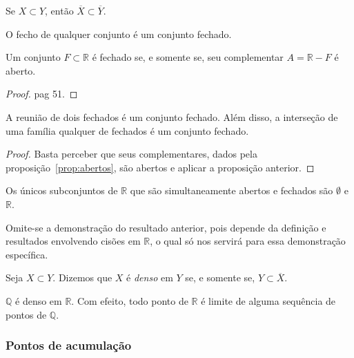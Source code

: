 \begin{proposicao}
	Se $X\subset Y$, então $\overline X \subset \overline Y$.
\end{proposicao}

\begin{proposicao}
	O fecho de qualquer conjunto é um conjunto fechado.
\end{proposicao}

\begin{proposicao}
	Um conjunto $F\subset \mathbb{R}$ é fechado se, e somente se, seu complementar $A= \mathbb{R}-F$ é aberto.
	\begin{proof}
		\cite{elonAnalise1} pag 51.
	\end{proof}
\end{proposicao}

\begin{corolario}
	A reunião de dois fechados é um conjunto fechado. Além disso, a interseção de uma família qualquer de fechados é um conjunto fechado. 
	\begin{proof}
		Basta perceber que seus complementares, dados pela proposição~\ref{prop:abertos}, são abertos e aplicar a proposição anterior.
	\end{proof}
\end{corolario}

\begin{proposicao}
	Os únicos subconjuntos de $\mathbb{R}$ que são simultaneamente abertos e fechados são $\emptyset$ e $\mathbb{R}$.
\end{proposicao}
Omite-se a demonstração do resultado anterior, pois depende da definição e resultados envolvendo cisões em $\mathbb{R}$, o qual só nos servirá para essa demonstração específica.

\begin{definicao}
	Seja $X\subset Y$. Dizemos que $X$ é \textit{denso} em $Y$ se, e somente se, $Y\subset \overline X$. 
\end{definicao}

\begin{exemplo}
	$\mathbb{Q}$ é denso em $\mathbb{R}$. Com efeito, todo ponto de $\mathbb{R}$ é limite de alguma sequência de pontos de $\mathbb{Q}$.
\end{exemplo}

\subsubsection{Pontos de acumulação}

